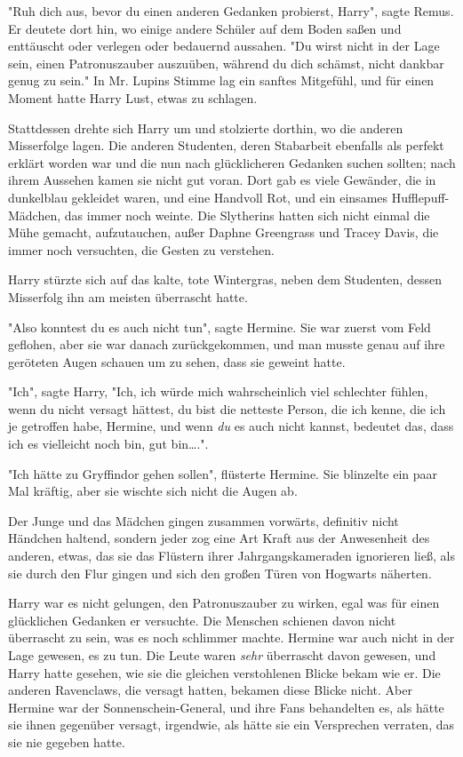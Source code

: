 {"Ruh dich aus, bevor du einen anderen Gedanken probierst, Harry", sagte Remus. Er deutete dort hin, wo einige andere Schüler auf dem Boden saßen und enttäuscht oder verlegen oder bedauernd aussahen. "Du wirst nicht in der Lage sein, einen Patronuszauber auszuüben, während du dich schämst, nicht dankbar genug zu sein." In Mr. Lupins Stimme lag ein sanftes Mitgefühl, und für einen Moment hatte Harry Lust, etwas zu schlagen.

Stattdessen drehte sich Harry um und stolzierte dorthin, wo die anderen Misserfolge lagen. Die anderen Studenten, deren Stabarbeit ebenfalls als perfekt erklärt worden war und die nun nach glücklicheren Gedanken suchen sollten; nach ihrem Aussehen kamen sie nicht gut voran. Dort gab es viele Gewänder, die in dunkelblau gekleidet waren, und eine Handvoll Rot, und ein einsames Hufflepuff-Mädchen, das immer noch weinte. Die Slytherins hatten sich nicht einmal die Mühe gemacht, aufzutauchen, außer Daphne Greengrass und Tracey Davis, die immer noch versuchten, die Gesten zu verstehen.

Harry stürzte sich auf das kalte, tote Wintergras, neben dem Studenten, dessen Misserfolg ihn am meisten überrascht hatte.

"Also konntest du es auch nicht tun", sagte Hermine. Sie war zuerst vom Feld geflohen, aber sie war danach zurückgekommen, und man musste genau auf ihre geröteten Augen schauen um zu sehen, dass sie geweint hatte.

"Ich", sagte Harry, "Ich, ich würde mich wahrscheinlich viel schlechter fühlen, wenn du nicht versagt hättest, du bist die netteste Person, die ich kenne, die ich je getroffen habe, Hermine, und wenn \emph{du} es auch nicht kannst, bedeutet das, dass ich es vielleicht noch bin, gut bin….".

"Ich hätte zu Gryffindor gehen sollen", flüsterte Hermine. Sie blinzelte ein paar Mal kräftig, aber sie wischte sich nicht die Augen ab.

Der Junge und das Mädchen gingen zusammen vorwärts, definitiv nicht Händchen haltend, sondern jeder zog eine Art Kraft aus der Anwesenheit des anderen, etwas, das sie das Flüstern ihrer Jahrgangskameraden ignorieren ließ, als sie durch den Flur gingen und sich den großen Türen von Hogwarts näherten.

Harry war es nicht gelungen, den Patronuszauber zu wirken, egal was für einen glücklichen Gedanken er versuchte. Die Menschen schienen davon nicht überrascht zu sein, was es noch schlimmer machte. Hermine war auch nicht in der Lage gewesen, es zu tun. Die Leute waren \emph{sehr} überrascht davon gewesen, und Harry hatte gesehen, wie sie die gleichen verstohlenen Blicke bekam wie er. Die anderen Ravenclaws, die versagt hatten, bekamen diese Blicke nicht. Aber Hermine war der Sonnenschein-General, und ihre Fans behandelten es, als hätte sie ihnen gegenüber versagt, irgendwie, als hätte sie ein Versprechen verraten, das sie nie gegeben hatte.

}

